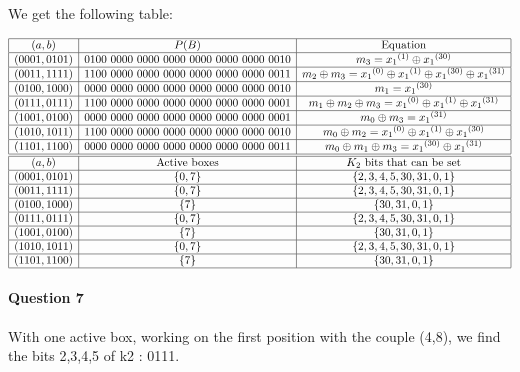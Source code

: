 \documentclass[a4paper]{article}
\begin{document}
We get the following table:

\begin{equation*}
  \begin{array}{|c|c|c|}
    \hline
    (a,b) & P(B) & \text{Equation} \\
    \hline
    (0001,0101) & 0100\ 0000\ 0000\ 0000\ 0000\ 0000\ 0000\ 0010 & m_3 = {x_1}^{(1)} \oplus {x_1}^{(30)} \\
    \hline
    (0011,1111) & 1100\ 0000\ 0000\ 0000\ 0000\ 0000\ 0000\ 0011 & m_2 \oplus m_3 = {x_1}^{(0)} \oplus {x_1}^{(1)} \oplus {x_1}^{(30)} \oplus {x_1}^{(31)} \\
    \hline
    (0100,1000) & 0000\ 0000\ 0000\ 0000\ 0000\ 0000\ 0000\ 0010 & m_1 = {x_1}^{(30)} \\
    \hline
    (0111,0111) & 1100\ 0000\ 0000\ 0000\ 0000\ 0000\ 0000\ 0001 & m_1 \oplus m_2 \oplus m_3 = {x_1}^{(0)} \oplus {x_1}^{(1)} \oplus {x_1}^{(31)} \\
    \hline
    (1001,0100) & 0000\ 0000\ 0000\ 0000\ 0000\ 0000\ 0000\ 0001 & m_0 \oplus m_3 = {x_1}^{(31)} \\
    \hline
    (1010,1011) & 1100\ 0000\ 0000\ 0000\ 0000\ 0000\ 0000\ 0010 & m_0 \oplus m_2 = {x_1}^{(0)} \oplus {x_1}^{(1)} \oplus {x_1}^{(30)} \\
    \hline
    (1101,1100) & 0000\ 0000\ 0000\ 0000\ 0000\ 0000\ 0000\ 0011 & m_0 \oplus m_1 \oplus m_3 = {x_1}^{(30)} \oplus {x_1}^{(31)} \\
    \hline
    \hline
    (a,b) & \text{Active boxes} & K_2 \text{ bits that can be set} \\
    \hline
    (0001,0101) & \{0, 7\} & \{2, 3, 4, 5, 30, 31, 0, 1\} \\
    \hline
    (0011,1111) & \{0, 7\} & \{2, 3, 4, 5, 30, 31, 0, 1\} \\
    \hline
    (0100,1000) & \{7\} & \{30, 31, 0, 1\} \\
    \hline
    (0111,0111) & \{0, 7\} & \{2, 3, 4, 5, 30, 31, 0, 1\} \\
    \hline
    (1001,0100) & \{7\} & \{30, 31, 0, 1\} \\
    \hline
    (1010,1011) & \{0, 7\} & \{2, 3, 4, 5, 30, 31, 0, 1\} \\
    \hline
    (1101,1100) & \{7\} & \{30, 31, 0, 1\}  \\
    \hline
  \end{array}
\end{equation*}

\paragraph{Question 7}
With one active box, working on the first position with the couple (4,8), we find the bits 2,3,4,5 of k2 : 0111.
\end{document}

